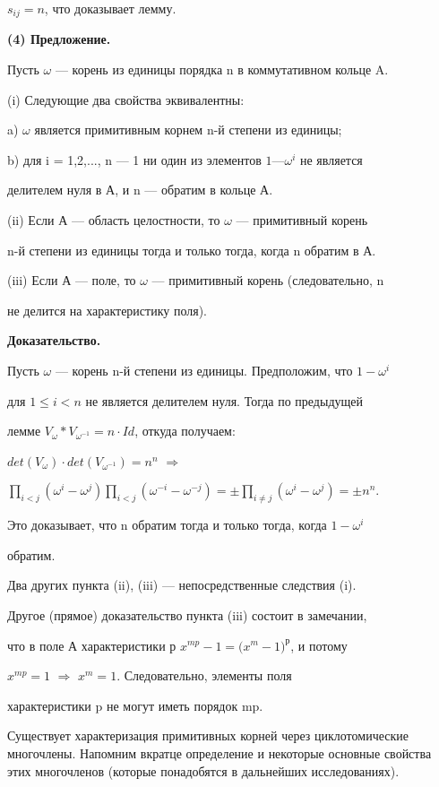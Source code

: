 \documentclass{mai_book}
\begin{document}
 $s_{ij} = n$, что доказывает лемму.
\bigskip

\textbf{(4) Предложение.}

Пусть $\omega$ — корень из единицы порядка n в коммутативном кольце A.

(i) Следующие два свойства эквивалентны:

a) $\omega$ является примитивным корнем n-й степени из единицы;

b) для i = 1,2,..., n — 1 ни один из элементов $1 — {\omega}^i$ не является

делителем нуля в А, и n — обратим в кольце А.
\

(ii) Если А — область целостности, то $\omega$ — примитивный корень

n-й степени из единицы тогда и только тогда, когда n обратим в А.

(iii) Если А — поле, то $\omega$ — примитивный корень (следовательно, n

не делится на характеристику поля).\bigskip

\textbf{Доказательство.}

Пусть $\omega$ — корень n-й степени из единицы. Предположим, что $1 - {\omega}^i$

для $1 \leq i < n$ не является делителем нуля. Тогда по предыдущей

лемме $V_{\omega} \ast V_{\omega^{-1}} = n \cdot {Id}$, откуда получаем:\bigskip

$det(V_{\omega})\cdot det(V_{\omega^{-1}}) = n^n$ $\Rightarrow$ \bigskip

$\prod\limits_{i < j}({\omega}^i - {\omega}^j) \prod\limits_{i < j}({\omega}^{-i} - {\omega}^{-j}) = 
\pm \prod\limits_{i \neq j}({\omega}^i - {\omega}^j) = \pm n^n.$ \bigskip

Это доказывает, что n обратим тогда и только тогда, когда $1 - {\omega}^i$

обратим.

Два других пункта (ii), (iii) — непосредственные следствия (i).

Другое (прямое) доказательство пункта (iii) состоит в замечании,

что в поле А характеристики р ${x^{mp}} - 1 = {{(x^{m}} - 1)}^{р}$, и потому

$x^{mp}=1$ $\Rightarrow$ $x^{m}=1$. Следовательно, элементы поля 

характеристики p не могут иметь порядок mp.\bigskip

Существует характеризация примитивных корней через циклотомические многочлены. Напомним вкратце определение и некоторые 
основные свойства этих многочленов (которые понадобятся в дальнейших
исследованиях).\bigskip
\end{document}
